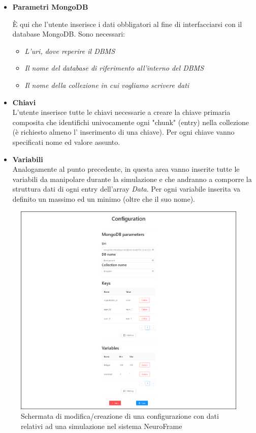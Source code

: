 \begin{itemize}
    \item {\bf Parametri MongoDB}\\
    {È qui che l'utente inserisce i dati obbligatori al fine di interfacciarsi con il database MongoDB.\newline
    \noindent Sono necessari:
    \begin{itemize}
        \item \emph{L'uri, dove reperire il DBMS}
        \item \emph{Il nome del database di riferimento all'interno del DBMS}
        \item \emph{Il nome della collezione in cui vogliamo scrivere dati}
    \end{itemize}}
    \item {\bf Chiavi}\\
    {L'utente inserisce tutte le chiavi necessarie a creare la chiave primaria composita che identifichi univocamente ogni "chunk" (entry) nella collezione (è richiesto almeno l' inserimento di una chiave).\newline
    Per ogni chiave vanno specificati nome ed valore assunto.}
    \vspace{20mm}
    \item {\bf Variabili}\\
    {Analogamente al punto precedente, in questa area vanno inserite tutte le variabili da manipolare durante la simulazione e che andranno a comporre la struttura dati di ogni entry dell'array \emph{Data}.\newline
    Per ogni variabile inserita va definito un massimo ed un minimo (oltre che il suo nome).}
\end{itemize}
\begin{figure}[H]
    \centering
    \includegraphics[width=1.0\textwidth]{img/simulator_edit_screenshot.png}
    \caption{Schermata di modifica/creazione di una configurazione con dati relativi ad una simulazione nel sistema NeuroFrame}
\end{figure}

